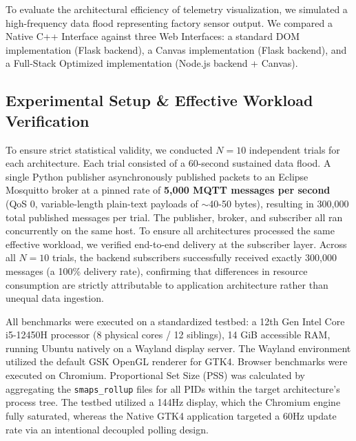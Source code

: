 \documentclass[lettersize,journal]{IEEEtran}
\begin{document}
To evaluate the architectural efficiency of telemetry visualization, we simulated a high-frequency data flood representing factory sensor output. We compared a Native C++ Interface against three Web Interfaces: a standard DOM implementation (Flask backend), a Canvas implementation (Flask backend), and a Full-Stack Optimized implementation (Node.js backend + Canvas).

\subsection{Experimental Setup \& Effective Workload Verification}
To ensure strict statistical validity, we conducted $N=10$ independent trials for each architecture. Each trial consisted of a 60-second sustained data flood. A single Python publisher asynchronously published packets to an Eclipse Mosquitto broker at a pinned rate of \textbf{5,000 MQTT messages per second} (QoS 0, variable-length plain-text payloads of $\sim$40-50 bytes), resulting in 300,000 total published messages per trial. The publisher, broker, and subscriber all ran concurrently on the same host. To ensure all architectures processed the same effective workload, we verified end-to-end delivery at the subscriber layer. Across all $N=10$ trials, the backend subscribers successfully received exactly 300,000 messages (a 100\% delivery rate), confirming that differences in resource consumption are strictly attributable to application architecture rather than unequal data ingestion.

All benchmarks were executed on a standardized testbed: a 12th Gen Intel Core i5-12450H processor (8 physical cores / 12 siblings), 14 GiB accessible RAM, running Ubuntu natively on a Wayland display server. The Wayland environment utilized the default GSK OpenGL renderer for GTK4. Browser benchmarks were executed on Chromium. Proportional Set Size (PSS) was calculated by aggregating the \texttt{smaps\_rollup} files for all PIDs within the target architecture's process tree. The testbed utilized a 144Hz display, which the Chromium engine fully saturated, whereas the Native GTK4 application targeted a 60Hz update rate via an intentional decoupled polling design.
\end{document}

